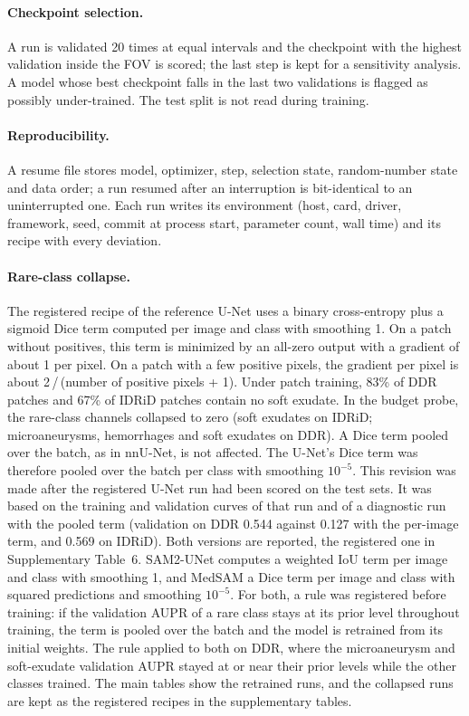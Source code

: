 \paragraph{Checkpoint selection.} A run is validated 20 times at equal intervals and the checkpoint with the highest validation \mAUPR{} inside the FOV is scored; the last step is kept for a sensitivity analysis. A model whose best checkpoint falls in the last two validations is flagged as possibly under-trained. The test split is not read during training.

\paragraph{Reproducibility.} A resume file stores model, optimizer, step, selection state, random-number state and data order; a run resumed after an interruption is bit-identical to an uninterrupted one. Each run writes its environment (host, card, driver, framework, seed, commit at process start, parameter count, wall time) and its recipe with every deviation.

\paragraph{Rare-class collapse.} The registered recipe of the reference U-Net uses a binary cross-entropy plus a sigmoid Dice term computed per image and class with smoothing 1. On a patch without positives, this term is minimized by an all-zero output with a gradient of about 1 per pixel. On a patch with a few positive pixels, the gradient per pixel is about 2\,/\,(number of positive pixels + 1). Under patch training, 83\% of DDR patches and 67\% of IDRiD patches contain no soft exudate. In the budget probe, the rare-class channels collapsed to zero (soft exudates on IDRiD; microaneurysms, hemorrhages and soft exudates on DDR). A Dice term pooled over the batch, as in nnU-Net, is not affected. The U-Net's Dice term was therefore pooled over the batch per class with smoothing $10^{-5}$. This revision was made after the registered U-Net run had been scored on the test sets. It was based on the training and validation curves of that run and of a diagnostic run with the pooled term (validation \mAUPR{} on DDR 0.544 against 0.127 with the per-image term, and 0.569 on IDRiD). Both versions are reported, the registered one in Supplementary Table~6.
SAM2-UNet computes a weighted IoU term per image and class with smoothing 1, and MedSAM a Dice term per image and class with squared predictions and smoothing $10^{-5}$. For both, a rule was registered before training: if the validation AUPR of a rare class stays at its prior level throughout training, the term is pooled over the batch and the model is retrained from its initial weights. The rule applied to both on DDR, where the microaneurysm and soft-exudate validation AUPR stayed at or near their prior levels while the other classes trained. The main tables show the retrained runs, and the collapsed runs are kept as the registered recipes in the supplementary tables.

